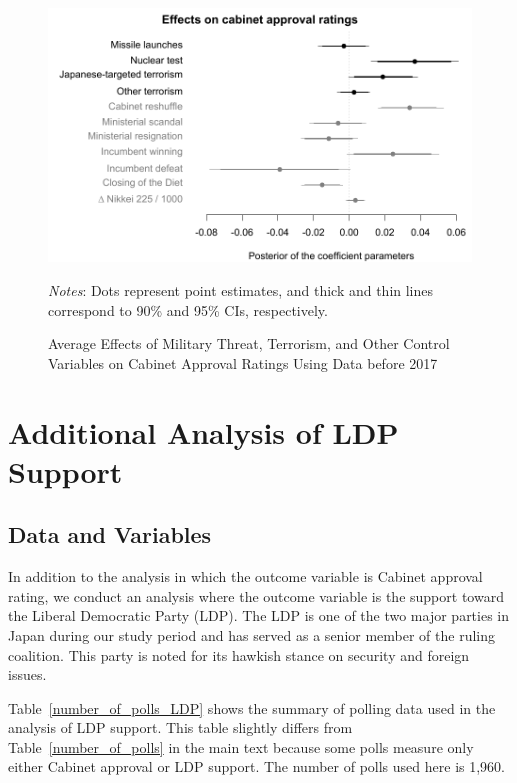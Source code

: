 \documentclass[12pt,letterpaper]{scrartcl}
\begin{document}
\begin{figure}[!ht]
\begin{minipage}{\hsize}
\centering
\singlespacing
\includegraphics[scale=1]{Figure_POQ/analysis_before_2017.pdf}
\caption{Average Effects of Military Threat, Terrorism, and Other Control Variables on Cabinet Approval Ratings Using Data before 2017}
\label{analysis_before_2017}
\end{minipage}
\begin{minipage}{\hsize}
\singlespacing
\small
\emph{Notes}: Dots represent point estimates, and thick and thin lines correspond to 90\% and 95\% CIs, respectively.
\end{minipage}
\end{figure}

\section{Additional Analysis of LDP Support}\label{app:sec:res}

\subsection{Data and Variables}\label{app:subsec:ldp}

In addition to the analysis in which the outcome variable is Cabinet approval rating, we conduct an analysis where the outcome variable is the support toward the Liberal Democratic Party (LDP). The LDP is one of the two major parties in Japan during our study period and has served as a senior member of the ruling coalition. This party is noted for its hawkish stance on security and foreign issues.

Table~\ref{number_of_polls_LDP} shows the summary of polling data used in the analysis of LDP support. This table slightly differs from Table~\ref{number_of_polls} in the main text because some polls measure only either Cabinet approval or LDP support. The number of polls used here is 1,960.
\end{document}
